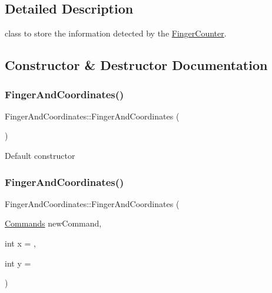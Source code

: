 \subsection{Detailed Description}
class to store the information detected by the \hyperlink{classFingerCounter}{Finger\+Counter}. 

\subsection{Constructor \& Destructor Documentation}
\mbox{\label{classFingerAndCoordinates_a9d24b8b3b3237f0a39762a52daf6f6a5}} 
\subsubsection{\texorpdfstring{Finger\+And\+Coordinates()}{FingerAndCoordinates()}\hspace{0.1cm}{\footnotesize\ttfamily [1/2]}}
{\footnotesize\ttfamily Finger\+And\+Coordinates\+::\+Finger\+And\+Coordinates (\begin{DoxyParamCaption}{ }\end{DoxyParamCaption})}

Default constructor \mbox{\label{classFingerAndCoordinates_a907ced00a2a2075194c38b9a356bfb60}} 
\subsubsection{\texorpdfstring{Finger\+And\+Coordinates()}{FingerAndCoordinates()}\hspace{0.1cm}{\footnotesize\ttfamily [2/2]}}
{\footnotesize\ttfamily Finger\+And\+Coordinates\+::\+Finger\+And\+Coordinates (\begin{DoxyParamCaption}\item[{\hyperlink{Commands_8h_a1939e90743463fb34c8c571ec0590430}{Commands}}]{new\+Command,  }\item[{int}]{x = {},  }\item[{int}]{y = {} }\end{DoxyParamCaption})}

